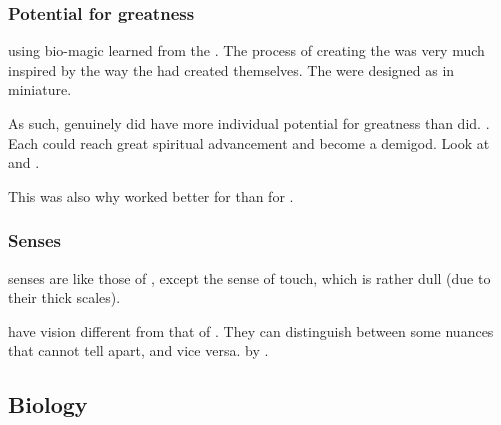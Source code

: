 \subsubsection{Potential for greatness}
 using bio-magic learned from the \xss.
The process of creating the \scathae was very much inspired by the way the \dragons had created themselves.
The \scathae were designed as \dragons in miniature.

As such, \scathae genuinely did have more individual potential for greatness than \humans did.
.
Each \scatha could reach great spiritual advancement and become a demigod.
Look at  and . 

This was also why  worked better for \scathae than for \humans. 





\subsubsection{Senses}
\Scathaese{} senses are like those of \humans, except the sense of touch, which is rather dull (due to their thick scales). 

\Scathae{} have \colour vision different from that of \humans. They can distinguish between some nuances that \humans{} cannot tell apart, and vice versa.  by .









\subsection{Biology}


